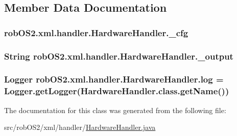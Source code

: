 \subsection{Member Data Documentation}
\hypertarget{classrob_o_s2_1_1xml_1_1handler_1_1_hardware_handler_ab059c6f5d610abbe79431fc349ae54b5}{
\subsubsection[{\_\-cfg}]{ {\bf robOS2.xml.handler.HardwareHandler.\_\-cfg}}}
\label{classrob_o_s2_1_1xml_1_1handler_1_1_hardware_handler_ab059c6f5d610abbe79431fc349ae54b5}
\hypertarget{classrob_o_s2_1_1xml_1_1handler_1_1_hardware_handler_a01fc1a41c0409d9b96a154f49f59a931}{
\subsubsection[{\_\-output}]{\setlength{\rightskip}{0pt plus 5cm}String {\bf robOS2.xml.handler.HardwareHandler.\_\-output}}}
\label{classrob_o_s2_1_1xml_1_1handler_1_1_hardware_handler_a01fc1a41c0409d9b96a154f49f59a931}
\hypertarget{classrob_o_s2_1_1xml_1_1handler_1_1_hardware_handler_a2a7bfa76e4fd13a11bf55d8ff87cf478}{
\subsubsection[{log}]{\setlength{\rightskip}{0pt plus 5cm}Logger {\bf robOS2.xml.handler.HardwareHandler.log} = Logger.getLogger(HardwareHandler.class.getName())}}
\label{classrob_o_s2_1_1xml_1_1handler_1_1_hardware_handler_a2a7bfa76e4fd13a11bf55d8ff87cf478}


The documentation for this class was generated from the following file:\begin{DoxyCompactItemize}
\item 
src/robOS2/xml/handler/\hyperlink{_hardware_handler_8java}{HardwareHandler.java}\end{DoxyCompactItemize}
